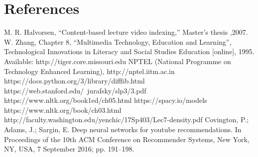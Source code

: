 \documentclass[conference]{IEEEtran}
\begin{document}
\section*{References}
\begin{thebibliography}{11}
     M. R. Halvorsen, “Content-based lecture video indexing,” Master’s thesis ,2007.
     W. Zhang, Chapter 8, “Multimedia Technology, Education and Learning”, Technological Innovations in Literacy and Social Studies Education [online], 1995. Available: http://tiger.core.missouri.edu 
     NPTEL (National Programme on Technology Enhanced Learning), http://nptel.iitm.ac.in
	 https://docs.python.org/3/library/difflib.html
	 https://web.stanford.edu/~jurafsky/slp3/3.pdf
	 https://www.nltk.org/book1ed/ch05.html
	 https://spacy.io/models
	 https://www.nltk.org/book/ch03.html
	 http://faculty.washington.edu/yenchic/17Sp403/Lec7-density.pdf
	 Covington, P.; Adams, J.; Sargin, E. Deep neural networks for youtube recommendations. In Proceedings of the 10th ACM Conference on Recommender Systems, New York, NY, USA, 7 September 2016; pp. 191–198.
\end{thebibliography}
\end{document}
